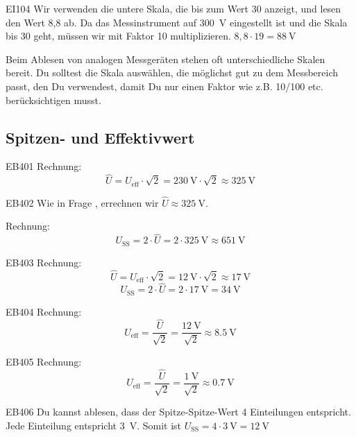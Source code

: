 \begin{sol}{EI104}
 Wir verwenden die untere Skala, die bis zum Wert 30 anzeigt, und lesen den Wert 8,8 ab. Da das Messinstrument auf \SI{300}{\volt} eingestellt ist und die Skala bis 30 geht, müssen wir mit Faktor 10 multiplizieren.
 $8,8 \cdot 19 = \SI{88}{\volt}$
\end{sol}

\begin{ohmchapter}
Beim Ablesen von analogen Messgeräten stehen oft unterschiedliche Skalen bereit. Du solltest die Skala auswählen, die möglichst gut zu dem Messbereich passt, den Du verwendest, damit Du nur einen Faktor wie z.B. 10/100 etc. berücksichtigen musst.
\end{ohmchapter}   

\subsection{Spitzen- und Effektivwert}

\begin{sol}{EB401}
 Rechnung:
   $$\hat{U} = U_\text{eff} \cdot \sqrt{2} = \SI{230}{\volt} \cdot \sqrt{2} \approx \SI{325}{\volt}$$
\end{sol}

\begin{sol}{EB402}
 Wie in Frage , errechnen wir $\hat{U} \approx \SI{325}{\volt}$.

 Rechnung: $$U_\text{SS} = 2 \cdot \hat{U} = 2 \cdot \SI{325}{\volt} \approx  \SI{651}{\volt}$$
\end{sol}


\begin{sol}{EB403}
 Rechnung:
   $$\hat{U} = U_\text{eff} \cdot \sqrt{2} = \SI{12}{\volt} \cdot \sqrt{2} \approx \SI{17}{\volt}$$
   $$U_\text{SS} = 2 \cdot \hat{U} = 2 \cdot \SI{17}{\volt} = \SI{34}{\volt} $$
\end{sol}


\begin{sol}{EB404}
 Rechnung:
   $$U_\text{eff} = \frac{\hat{U}}{\sqrt{2}} = \frac{\SI{12}{\volt}}{\sqrt{2}}  \approx \SI{8.5}{\volt}$$
\end{sol}


\begin{sol}{EB405}
 Rechnung:
   $$U_\text{eff} = \frac{\hat{U}}{\sqrt{2}} = \frac{\SI{1}{\volt}}{\sqrt{2}}  \approx \SI{0.7}{\volt}$$
\end{sol}

\begin{sol}{EB406}
 Du kannst ablesen, dass der Spitze-Spitze-Wert 4 Einteilungen entspricht. Jede Einteilung entspricht \SI{3}{\volt}.
 Somit ist $U_\text{SS} = 4 \cdot \SI{3}{\volt} = \SI{12}{\volt}$
\end{sol}



